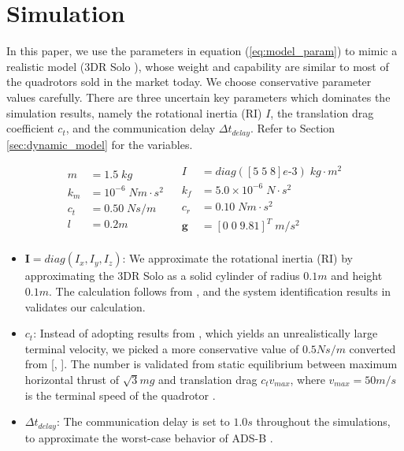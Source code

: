 \documentclass[journal,11pt,onecolumn,draftclsnofoot,]{IEEEtran}
\begin{document}
\section{\textbf{Simulation}} \label{sec:simulation}


In this paper, we use the parameters in equation (\ref{eq:model_param}) to mimic a realistic model (3DR Solo \cite{3dr_solo}), whose weight and capability are similar to most of the quadrotors sold in the market today. We choose conservative parameter values carefully. There are three uncertain key parameters which dominates the simulation results, namely the rotational inertia (RI) $I$, the translation drag coefficient $c_t$, and the communication delay $\Delta t_{delay}$. Refer to Section \ref{sec:dynamic_model} for the variables.

\begin{equation}
\label{eq:model_param}
\begin{aligned}
m &= 1.5 \; kg \\
k_m &= 10^{-6} \; Nm \cdot s^2 \;\;\; \\
c_t &=  0.50 \; Ns/m \;\;\;\\
l &= 0.2 m \\
\end{aligned}
\begin{aligned}
I &= diag([5 \; 5 \; 8]e\text{-}3) \; kg \cdot m^2 \\
k_f &= 5.0 \times 10^{-6} \; N \cdot s^2 \\
c_r &= 0.10 \; Nm \cdot s^2 \\
\boldsymbol{g} &= \left[0 \; 0\; 9.81 \right]^T \; m/s^2 \\
\end{aligned}
\end{equation}

\begin{itemize}
	\item $\boldsymbol{I}=diag(I_x,I_y,I_z)$: We approximate the rotational inertia (RI) by approximating the 3DR Solo as a solid cylinder of radius $0.1m$ and height $0.1m$. The calculation follows from \cite{beer1972statics}, and the system identification results in \cite{bouadi2011adaptive} validates our calculation.
	
	\item $c_t$: Instead of adopting results from \cite{bouadi2011adaptive}, which yields an unrealistically large terminal velocity, we picked a more conservative value of $0.5 Ns/m$ converted from [, ]. The number is validated from static equilibrium between maximum horizontal thrust of $\sqrt{3}mg$ and translation drag $c_t v_{max}$, where $v_{max}=50m/s$ is the terminal speed of the quadrotor \cite{quadrotor_common_speed}.
	
	\item $\Delta t_{delay}$: The communication delay is set to $1.0 s$ throughout the simulations, to approximate the worst-case behavior of ADS-B \cite{helfrick2010principles}.
\end{itemize}
\end{document}
